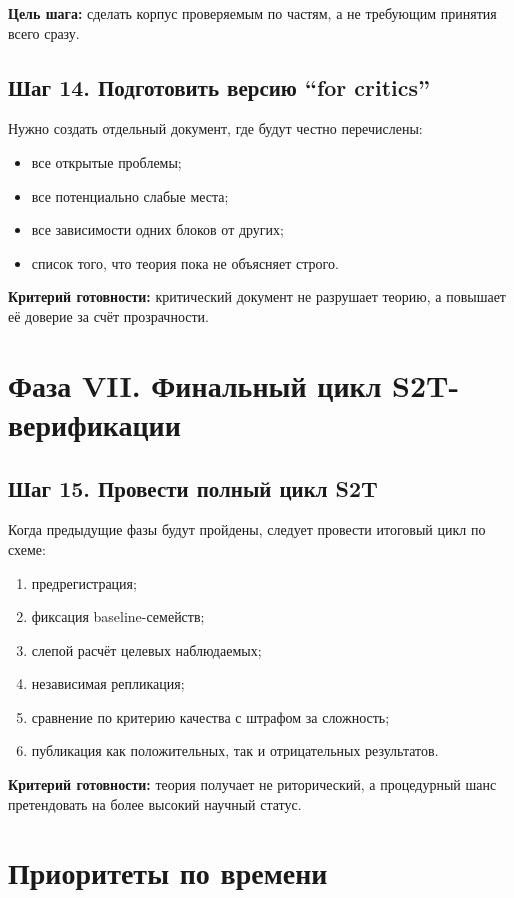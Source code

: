 \documentclass[12pt,a4paper]{article}
\begin{document}
\textbf{Цель шага:} сделать корпус проверяемым по частям, а не требующим принятия всего сразу.

\subsection{Шаг 14. Подготовить версию ``for critics''}

Нужно создать отдельный документ, где будут честно перечислены:
\begin{itemize}
    \item все открытые проблемы;
    \item все потенциально слабые места;
    \item все зависимости одних блоков от других;
    \item список того, что теория пока не объясняет строго.
\end{itemize}

\textbf{Критерий готовности:} критический документ не разрушает теорию, а повышает её доверие за счёт прозрачности.

\section{Фаза VII. Финальный цикл S2T-верификации}

\subsection{Шаг 15. Провести полный цикл S2T}

Когда предыдущие фазы будут пройдены, следует провести итоговый цикл по схеме:
\begin{enumerate}
    \item предрегистрация;
    \item фиксация baseline-семейств;
    \item слепой расчёт целевых наблюдаемых;
    \item независимая репликация;
    \item сравнение по критерию качества с штрафом за сложность;
    \item публикация как положительных, так и отрицательных результатов.
\end{enumerate}

\textbf{Критерий готовности:} теория получает не риторический, а процедурный шанс претендовать на более высокий научный статус.

\section{Приоритеты по времени}
\end{document}
